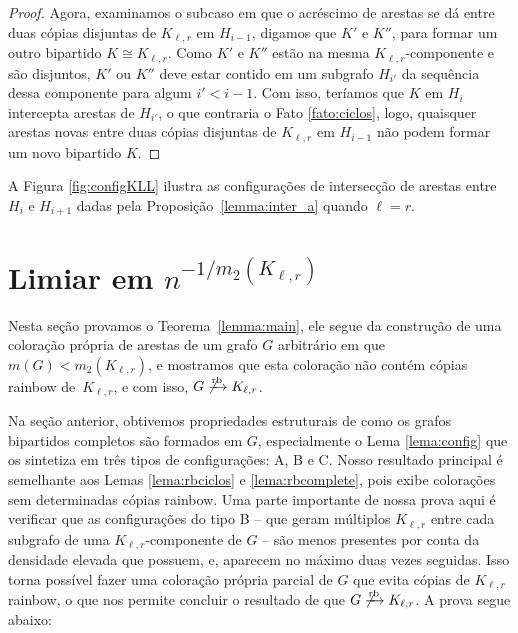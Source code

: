 \documentclass[12pt,a4paper]{book}
\newcommand{\K}{K_{\ell,r}} %
\def\rbarrow{\xrightarrow[]{\raisebox{0.0mm}[0mm]{$\scriptstyle \rm rb$}}}
\begin{document}
\begin{proof}
   Agora, examinamos o subcaso em que o acréscimo de arestas se dá entre duas cópias disjuntas de $\K$ em $H_{i-1}$, digamos que $K'$ e $K''$, para formar um outro bipartido $K\cong\K$.
    Como $K'$ e $K''$ estão na mesma $\K$-componente e são disjuntos, $K'$ ou $K''$ deve estar contido em um subgrafo $H_{i'}$ da sequência dessa componente para algum $i'<i-1$.
    Com isso, teríamos que $K$ em $H_i$ intercepta arestas de $H_{i'}$, o que contraria o Fato \ref{fato:ciclos}, logo, quaisquer arestas novas entre duas cópias disjuntas de $\K$ em $H_{i-1}$ não podem formar um novo bipartido $K$.

\end{proof}
  
  A Figura \ref{fig:configKLL} ilustra as configurações de intersecção de arestas entre $H_i$ e $H_{i+1}$ dadas pela Proposição~\ref{lemma:inter_a} quando $\ell=r$.

\section{Limiar em $n^{-1/m_2(K_{\ell,r})}$}
\label{sec:mainres}

Nesta seção provamos o Teorema~\ref{lemma:main}, ele segue da construção de uma coloração própria de arestas de um grafo $G$ arbitrário em que $m(G) < m_2(\K)$, e mostramos que esta coloração  não contém cópias rainbow de~$\K$, e com isso, $G \not\rbarrow \K$.

Na seção anterior, obtivemos propriedades estruturais de como os grafos bipartidos completos são formados em $G$, especialmente o Lema \ref{lema:config} que os sintetiza em três tipos de configurações: A, B e C.
Nosso resultado principal é semelhante aos Lemas \ref{lema:rbciclos} e \ref{lema:rbcomplete}, pois exibe colorações sem determinadas cópias rainbow. 
Uma parte importante de nossa prova aqui é verificar que as configurações do tipo B 
-- que geram múltiplos $\K$ entre cada subgrafo de uma $\K$-componente de $G$ -- 
são menos presentes por conta da densidade elevada que possuem, e, aparecem no máximo duas vezes seguidas. 
  Isso torna possível fazer uma coloração própria parcial de $G$ que evita cópias de $\K$ rainbow, o que nos permite concluir o resultado de que $G \not\rbarrow \K$.
  A prova segue abaixo:  
  
\end{document}
